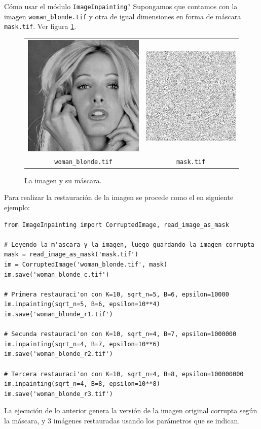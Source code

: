 \textquestiondown C\'omo usar el m\'odulo \texttt{ImageInpainting}? Supongamos que contamos con la imagen \texttt{woman\_blonde.tif} y otra de igual dimensiones en forma de m\'ascara \texttt{mask.tif}. Ver figura \ref{fig:woman_blonde}.
\begin{figure}[H]
	\centering
	\begin{tabular}{cc}
		\includegraphics[width=0.2\linewidth]{Graphics/Examples/woman_blonde.png}&
		\includegraphics[width=0.2\linewidth]{Graphics/Examples/mask.tif}\\
		\tiny\texttt{woman\_blonde.tif}&\tiny\texttt{mask.tif}\\
	\end{tabular}
	
	\caption{La imagen y su m\'ascara.}
	\label{fig:woman_blonde}
\end{figure}
Para realizar la restauraci\'on de la imagen se procede como el en siguiente ejemplo:
\begin{lstlisting}
from ImageInpainting import CorruptedImage, read_image_as_mask

# Leyendo la m'ascara y la imagen, luego guardando la imagen corrupta
mask = read_image_as_mask('mask.tif')
im = CorruptedImage('woman_blonde.tif', mask)
im.save('woman_blonde_c.tif')

# Primera restauraci'on con K=10, sqrt_n=5, B=6, epsilon=10000 
im.inpainting(sqrt_n=5, B=6, epsilon=10**4)
im.save('woman_blonde_r1.tif')

# Secunda restauraci'on con K=10, sqrt_n=4, B=7, epsilon=1000000
im.inpainting(sqrt_n=4, B=7, epsilon=10**6)
im.save('woman_blonde_r2.tif')

# Tercera restauraci'on con K=10, sqrt_n=4, B=8, epsilon=100000000 
im.inpainting(sqrt_n=4, B=8, epsilon=10**8)
im.save('woman_blonde_r3.tif')
\end{lstlisting}
La ejecuci\'on de lo anterior genera la versi\'on de la imagen original corrupta seg\'un la m\'ascara, y 3 im\'agenes restauradas usando los par\'ametros que se indican.
